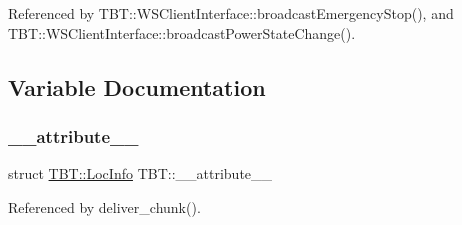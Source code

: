 Referenced by T\+B\+T\+::\+W\+S\+Client\+Interface\+::broadcast\+Emergency\+Stop(), and T\+B\+T\+::\+W\+S\+Client\+Interface\+::broadcast\+Power\+State\+Change().



\subsection{Variable Documentation}
\mbox{\label{namespaceTBT_a625f01f6d8d0db8cd557bae99d0a8ae0_a625f01f6d8d0db8cd557bae99d0a8ae0}} 
\subsubsection{\texorpdfstring{\+\_\+\+\_\+attribute\+\_\+\+\_\+}{\_\_attribute\_\_}}
{\footnotesize\ttfamily struct \hyperlink{structTBT_1_1LocInfo}{T\+B\+T\+::\+Loc\+Info} T\+B\+T\+::\+\_\+\+\_\+attribute\+\_\+\+\_\+}



Referenced by deliver\+\_\+chunk().


